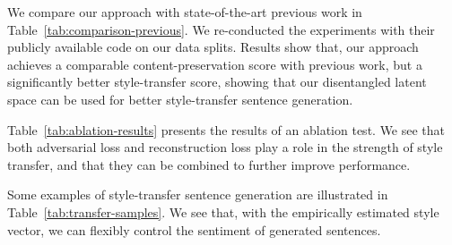 \documentclass[11pt,a4paper]{article}
\begin{document}
We compare our approach with state-of-the-art previous work in Table~\ref{tab:comparison-previous}. We re-conducted the experiments with their publicly available code on our data splits.
Results show that, our approach achieves a comparable content-preservation score with previous work, but a significantly better style-transfer score, showing that our disentangled latent space can be used for better style-transfer sentence generation.

Table~\ref{tab:ablation-results} presents the results of an ablation test. We see that both adversarial loss and reconstruction loss play a role in the strength of style transfer, and that they can be combined to further improve performance.


Some examples of style-transfer sentence generation are illustrated in Table~\ref{tab:transfer-samples}. We see that, with the empirically estimated style vector, we can flexibly control the sentiment of generated sentences.
\end{document}

